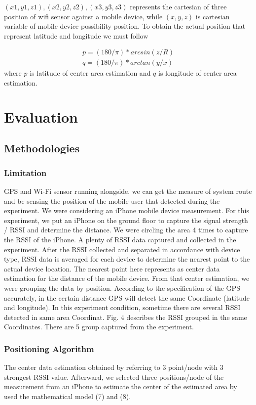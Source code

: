 \documentclass[twocolumn,10pt]{asme2ej}
\begin{document}
    ${(x1,y1,z1),(x2,y2,z2),(x3,y3,z3)}$ represents the cartesian of three position of wifi sensor against a mobile device, while $(x,y,z)$ is cartesian variable of mobile device possibility position. To obtain the actual position that represent latitude and longitude we must follow

	\begin{eqnarray}
	p = (180/\pi)*arcsin(z/R) \\
	q = (180/\pi)*arctan(y/x)
	\end{eqnarray}
    where $p$ is latitude of center area estimation and $q$ is longitude of center area estimation.

	\section{Evaluation}
	\subsection{Methodologies}
	\subsubsection{Limitation}
	GPS and Wi-Fi sensor running alongside, we can get the measure of system route and be sensing the position of the mobile user that detected during the experiment. We were considering an iPhone mobile device measurement. For this experiment, we put an iPhone on the ground floor to capture the signal strength / RSSI and determine the distance. We were circling the area 4 times to capture the RSSI of the iPhone. A plenty of RSSI data captured and collected in the experiment. After the RSSI collected and separated in accordance with device type, RSSI data is averaged for each device to determine the nearest point to the actual device location. The nearest point here represents as center data estimation for the distance of the mobile device. From that center estimation, we were grouping the data by position. According to the specification of the GPS accurately, in the certain distance GPS will detect the same Coordinate (latitude and longitude). In this experiment condition, sometime there are several RSSI detected in same area Coordinat. Fig. 4 describes the RSSI grouped in the same Coordinates. There are 5 group captured from the experiment.   
	
	\subsubsection{Positioning Algorithm}
	The center data estimation obtained by referring to 3 point/node with 3 strongest RSSI value.  
	Afterward, we selected three positions/node of the measurement from an iPhone to estimate the center of the estimated area by used the mathematical model (7) and (8).
	
\end{document}
